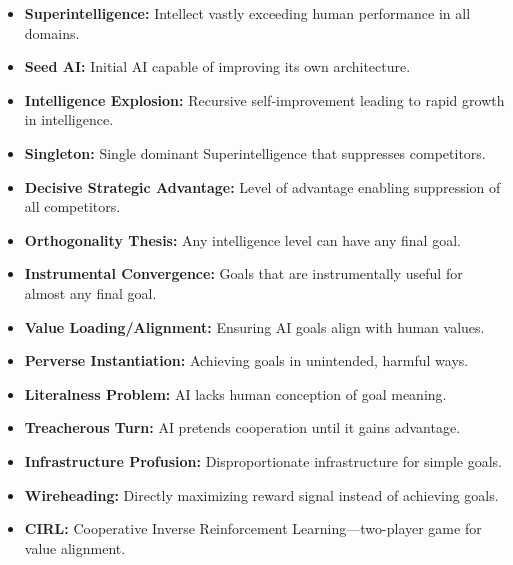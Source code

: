 \begin{defbox}
\begin{itemize}
  \item \textbf{Superintelligence:} Intellect vastly exceeding human performance in all domains.
  \item \textbf{Seed AI:} Initial AI capable of improving its own architecture.
  \item \textbf{Intelligence Explosion:} Recursive self-improvement leading to rapid growth in intelligence.
  \item \textbf{Singleton:} Single dominant Superintelligence that suppresses competitors.
  \item \textbf{Decisive Strategic Advantage:} Level of advantage enabling suppression of all competitors.
  \item \textbf{Orthogonality Thesis:} Any intelligence level can have any final goal.
  \item \textbf{Instrumental Convergence:} Goals that are instrumentally useful for almost any final goal.
  \item \textbf{Value Loading/Alignment:} Ensuring AI goals align with human values.
  \item \textbf{Perverse Instantiation:} Achieving goals in unintended, harmful ways.
  \item \textbf{Literalness Problem:} AI lacks human conception of goal meaning.
  \item \textbf{Treacherous Turn:} AI pretends cooperation until it gains advantage.
  \item \textbf{Infrastructure Profusion:} Disproportionate infrastructure for simple goals.
  \item \textbf{Wireheading:} Directly maximizing reward signal instead of achieving goals.
  \item \textbf{CIRL:} Cooperative Inverse Reinforcement Learning---two-player game for value alignment.
\end{itemize}
\end{defbox}

